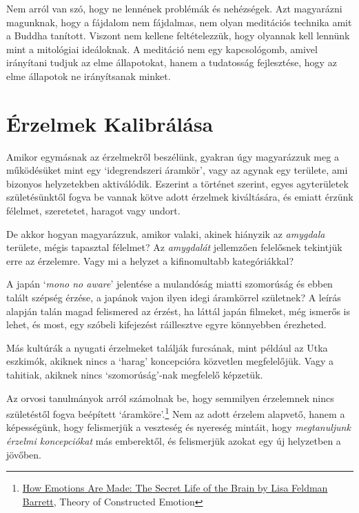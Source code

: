 Nem arról van szó, hogy ne lennének problémák és nehézségek. Azt
magyarázni magunknak, hogy a fájdalom nem fájdalmas, nem olyan
meditációs technika amit a Buddha tanított. Viszont nem kellene
feltételezzük, hogy olyannak kell lennünk mint a mitológiai ideáloknak.
A meditáció nem egy kapcsológomb, amivel irányítani tudjuk az elme
állapotokat, hanem a tudatosság fejlesztése, hogy az elme állapotok ne
irányítsanak minket.

\section{Érzelmek Kalibrálása}


\noindent Amikor egymásnak az érzelmekről beszélünk, gyakran úgy
magyarázzuk meg a működésüket mint egy `idegrendszeri áramkör', vagy az
agynak egy területe, ami bizonyos helyzetekben aktiválódik. Eszerint a
történet szerint, egyes agyterületek születésünktől fogva be vannak
kötve adott érzelmek kiváltására, és emiatt érzünk félelmet, szeretetet,
haragot vagy undort.

De akkor hogyan magyarázzuk, amikor valaki, akinek hiányzik az
\emph{amygdala} területe, mégis tapasztal félelmet? Az \emph{amygdalát}
jellemzően felelősnek tekintjük erre az érzelemre. Vagy mi a helyzet a
kifinomultabb kategóriákkal?

A japán `\emph{mono no aware}' jelentése a mulandóság miatti szomorúság
és ebben talált szépség érzése, a japánok vajon ilyen idegi áramkörrel
születnek? A leírás alapján talán magad felismered az érzést, ha láttál
japán filmeket, még ismerős is lehet, és most, egy szóbeli kifejezést
ráillesztve egyre könnyebben érezheted.

Más kultúrák a nyugati érzelmeket találják furcsának, mint például az
Utka eszkimók, akiknek nincs a `harag' koncepcióra közvetlen
megfelelőjük. Vagy a tahitiak, akiknek nincs `szomorúság'-nak megfelelő
képzetük.

\enlargethispage*{\baselineskip}

Az orvosi tanulmányok arról számolnak be, hogy semmilyen érzelemnek
nincs születéstől fogva beépített `áramköre'.\footnote{\href{https://www.goodreads.com/book/show/23719305-how-emotions-are-made}{How
  Emotions Are Made: The Secret Life of the Brain by Lisa Feldman
  Barrett}, Theory of Constructed Emotion} Nem az adott érzelem
alapvető, hanem a képességünk, hogy felismerjük a veszteség és nyereség
mintáit, hogy \emph{megtanuljunk érzelmi koncepciókat} más emberektől,
és felismerjük azokat egy új helyzetben a jövőben.


